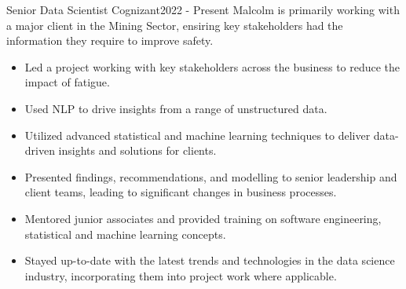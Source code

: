 
\begin{cventry}{Senior Data Scientist} {Cognizant}{}{2022 - Present}
  Malcolm is primarily working with a major client in the Mining Sector,
  ensiring key stakeholders had the information they require to improve safety.

  \begin{itemize}
    \item Led a project working with key stakeholders across the business to reduce the impact of fatigue.
    \item Used NLP to drive insights from a range of unstructured data.
    \item Utilized advanced statistical and machine learning techniques to deliver data-driven insights and solutions for clients.
    \item Presented findings, recommendations, and modelling to senior leadership and client teams, 
      leading to significant changes in business processes.
    \item Mentored junior associates and provided training on software engineering, statistical and machine learning concepts.
    \item Stayed up-to-date with the latest trends and technologies in the data science industry, incorporating them into project work where applicable.
  \end{itemize}
\end{cventry}

